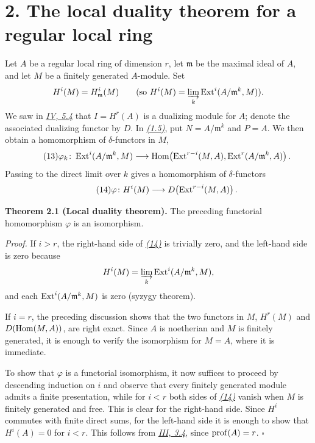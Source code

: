 \section*{2. The local duality theorem for a regular local ring}

Let $A$ be a regular local ring of dimension $r$, let $\mathfrak m$ be the
maximal ideal of $A$, and let $M$ be a finitely generated $A$-module. Set
\[
  H^i(M)=H^i_{\mathfrak m}(M)
  \qquad\text{(so }H^i(M)=\varinjlim_k
    \operatorname{Ext}^i(A/\mathfrak m^k,M)\text{)}.
\]
We saw in \emph{\hyperref[IV.5.4]{IV, 5.4}} that $I=H^r(A)$ is a dualizing module for $A$;
denote the associated dualizing functor by $D$. In \emph{\hyperref[eq:V.1.5]{(1.5)}}, put
$N=A/\mathfrak m^k$ and $P=A$. We then obtain a homomorphism of
$\delta$-functors in $M$,
\begin{equation}\tag{13}\label{eq:V.13}
  \varphi_k\colon \operatorname{Ext}^i(A/\mathfrak m^k,M)
  \longrightarrow
  \operatorname{Hom}\!\left(\operatorname{Ext}^{r-i}(M,A),
    \operatorname{Ext}^r(A/\mathfrak m^k,A)\right).
\end{equation}
Passing to the direct limit over $k$ gives a homomorphism of
$\delta$-functors
\begin{equation}\tag{14}\label{eq:V.14}
  \varphi\colon H^i(M)\longrightarrow
    D\!\left(\operatorname{Ext}^{r-i}(M,A)\right).
\end{equation}

\medskip
\noindent\textbf{Theorem 2.1 (Local duality theorem).}
The preceding functorial homomorphism $\varphi$ is an isomorphism.

\medskip
\noindent\textit{Proof.}
If $i>r$, the right-hand side of \emph{\hyperref[eq:V.14]{(14)}} is trivially zero,
and the left-hand side is zero because
\[
  H^i(M)=\varinjlim_k \operatorname{Ext}^i(A/\mathfrak m^k,M),
\]
and each $\operatorname{Ext}^i(A/\mathfrak m^k,M)$ is zero (syzygy theorem).

If $i=r$, the preceding discussion shows that the two functors in $M$,
$H^r(M)$ and $D(\operatorname{Hom}(M,A))$, are right exact. Since $A$ is noetherian
and $M$ is finitely generated, it is enough to verify the isomorphism for
$M=A$, where it is immediate.

To show that $\varphi$ is a functorial isomorphism, it now suffices to
proceed by descending induction on $i$ and observe that every finitely
generated module admits a finite presentation, while for $i<r$ both sides
of \emph{\hyperref[eq:V.14]{(14)}} vanish when $M$ is finitely generated and free. This is
clear for the right-hand side. Since $H^i$ commutes with finite direct sums,
for the left-hand side it is enough to show that $H^i(A)=0$ for $i<r$.
This follows from \emph{\hyperref[III.3.4]{III, 3.4}}, since $\operatorname{prof}(A)=r$. \hfill$\square$

